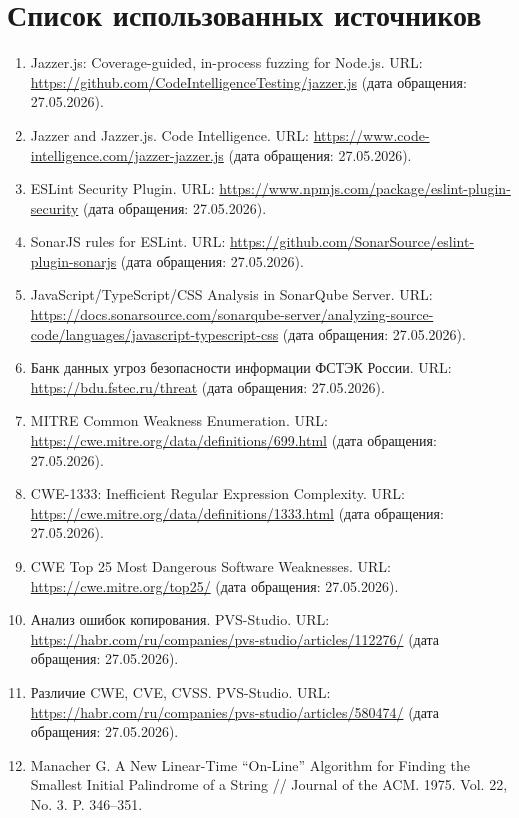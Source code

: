 \clearpage
{}
\chapter*{Список использованных источников}
\label{references}

\begin{enumerate}
    \item Jazzer.js: Coverage-guided, in-process fuzzing for Node.js. URL: \url{https://github.com/CodeIntelligenceTesting/jazzer.js} (дата обращения: 27.05.2026).
    \item Jazzer and Jazzer.js. Code Intelligence. URL: \url{https://www.code-intelligence.com/jazzer-jazzer.js} (дата обращения: 27.05.2026).
    \item ESLint Security Plugin. URL: \url{https://www.npmjs.com/package/eslint-plugin-security} (дата обращения: 27.05.2026).
    \item SonarJS rules for ESLint. URL: \url{https://github.com/SonarSource/eslint-plugin-sonarjs} (дата обращения: 27.05.2026).
    \item JavaScript/TypeScript/CSS Analysis in SonarQube Server. URL: \url{https://docs.sonarsource.com/sonarqube-server/analyzing-source-code/languages/javascript-typescript-css} (дата обращения: 27.05.2026).
    \item Банк данных угроз безопасности информации ФСТЭК России. URL: \url{https://bdu.fstec.ru/threat} (дата обращения: 27.05.2026).
    \item MITRE Common Weakness Enumeration. URL: \url{https://cwe.mitre.org/data/definitions/699.html} (дата обращения: 27.05.2026).
    \item CWE-1333: Inefficient Regular Expression Complexity. URL: \url{https://cwe.mitre.org/data/definitions/1333.html} (дата обращения: 27.05.2026).
    \item CWE Top 25 Most Dangerous Software Weaknesses. URL: \url{https://cwe.mitre.org/top25/} (дата обращения: 27.05.2026).
    \item Анализ ошибок копирования. PVS-Studio. URL: \url{https://habr.com/ru/companies/pvs-studio/articles/112276/} (дата обращения: 27.05.2026).
    \item Различие CWE, CVE, CVSS. PVS-Studio. URL: \url{https://habr.com/ru/companies/pvs-studio/articles/580474/} (дата обращения: 27.05.2026).
    \item Manacher G. A New Linear-Time ``On-Line'' Algorithm for Finding the Smallest Initial Palindrome of a String // Journal of the ACM. 1975. Vol. 22, No. 3. P. 346--351.
\end{enumerate}
